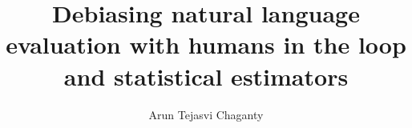\documentclass{report}
\begin{document}
\title{Debiasing natural language evaluation with humans in the loop and statistical estimators}
\author{Arun Tejasvi Chaganty}
 
\beforepreface{}


\afterpreface{}



\appendix



\end{document}

